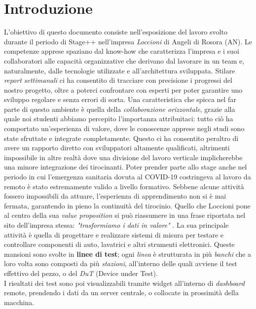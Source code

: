 \chapter{Introduzione}
\label{chap:intro}

L'obiettivo di questo documento consiste nell'esposizione del lavoro svolto durante il periodo di Stage++ nell'impresa \textit{Loccioni} di Angeli di Rosora (AN). Le competenze apprese spaziano dal know-how che caratterizza l'impresa e i suoi collaboratori alle capacità organizzative che derivano dal lavorare in un team e, naturalmente, dalle tecnologie utilizzate e all'architettura sviluppata.
Stilare \textit{report settimanali} ci ha consentito di tracciare con precisione i progressi del nostro progetto, oltre a poterci confrontare con esperti per poter garantire uno sviluppo regolare e senza errori di sorta.
Una caratteristica che spicca nel far parte di questo ambiente è quella della \textit{collaborazione orizzontale}, grazie alla quale noi studenti abbiamo percepito l'importanza attribuitaci: tutto ciò ha comportato un'esperienza di valore, dove le conoscenze apprese negli studi sono state sfruttate e integrate completamente.
Questo ci ha consentito peraltro di avere un rapporto diretto con sviluppatori altamente qualificati, altrimenti impossibile in altre realtà dove una divisione del lavoro verticale implicherebbe una minore integrazione dei tirocinanti.
Poter prender parte allo stage anche nel periodo in cui l'emergenza sanitaria dovuta al COVID-19 costringeva al lavoro da remoto è stato estremamente valido a livello formativo. Sebbene alcune attività fossero impossibili da attuare, l'esperienza di apprendimento non si è mai fermata, garantendo in pieno la continuità del tirocinio.
Quello che Loccioni pone al centro della sua \textit{value proposition} si può riassumere in una frase riportata nel sito dell'impresa stessa: \textit{"trasformiamo i dati in valore"} \cite{Loccioni}.
La sua principale attività è quella di progettare e realizzare sistemi di misura per 
testare e controllare componenti di auto, lavatrici e altri strumenti elettronici.
Queste mansioni sono svolte in \textbf{linee di test}; ogni \textit{linea} è strutturata in più \textit{banchi} che a loro volta sono composti da più \textit{stazioni}, all'interno delle quali avviene 
il test effettivo del pezzo, o del \textit{DuT} (Device under Test).\\
I risultati dei test sono poi visualizzabili tramite widget all'interno di \textit{dashboard} remote, prendendo i dati da un server centrale, 
o collocate in prossimità della macchina.
